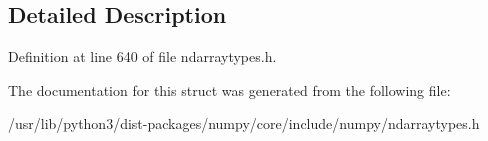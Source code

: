\subsection{Detailed Description}


Definition at line 640 of file ndarraytypes.\+h.



The documentation for this struct was generated from the following file\+:\begin{DoxyCompactItemize}
\item 
/usr/lib/python3/dist-\/packages/numpy/core/include/numpy/ndarraytypes.\+h\end{DoxyCompactItemize}
